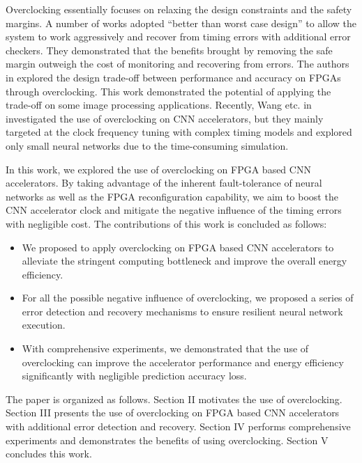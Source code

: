 Overclocking essentially focuses on relaxing the
design constraints and the safety margins. A number of works \cite{Razor} 
\cite{uht2004going} adopted “better than worst case design” to allow the system 
to work aggressively and recover from timing 
errors with additional error checkers. 
They demonstrated that the benefits
brought by removing the safe margin outweigh the cost
of monitoring and recovering from errors. 
The authors in \cite{overclock_3} explored the design trade-off 
between performance and accuracy on FPGAs through overclocking. 
This work demonstrated the potential of applying the trade-off on 
some image processing applications. Recently, Wang etc. in 
\cite{wang2017resilience} investigated 
the use of overclocking on CNN accelerators, but they mainly targeted at 
the clock frequency tuning with complex timing models and explored 
only small neural networks due to the time-consuming simulation.

In this work, we explored the use of overclocking on FPGA based 
CNN accelerators. By taking advantage of the inherent fault-tolerance 
of neural networks as well as the FPGA reconfiguration capability, we aim to 
boost the CNN accelerator clock and mitigate 
the negative influence of the timing errors with negligible cost. 
The contributions of this work is concluded as follows:

\begin{itemize}
	\item We proposed to apply overclocking on FPGA based CNN accelerators 
		to alleviate the stringent computing bottleneck and improve the 
		overall energy efficiency. 

	\item For all the possible negative influence of 
		overclocking, we proposed a series of error detection 
		and recovery mechanisms to ensure resilient neural network execution. 

	\item With comprehensive experiments, we demonstrated that the use 
		of overclocking can improve the accelerator performance and energy 
		efficiency significantly with negligible prediction accuracy loss.
\end{itemize}

The paper is organized as follows. Section II motivates the use of overclocking. 
Section III presents the use of overclocking on FPGA based CNN 
accelerators with additional error detection and recovery. 
Section IV performs comprehensive experiments and demonstrates the benefits 
of using overclocking. Section V concludes this work. 


